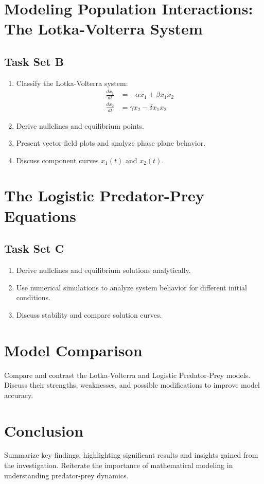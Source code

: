 \documentclass[12pt]{article}
\begin{document}
\section{Modeling Population Interactions: The Lotka-Volterra System}
\subsection{Task Set B}
\begin{enumerate}
    \item Classify the Lotka-Volterra system:
    \begin{align}
        \frac{dx_1}{dt} &= -\alpha x_1 + \beta x_1 x_2 \\
        \frac{dx_2}{dt} &= \gamma x_2 - \delta x_1 x_2
    \end{align}
    \item Derive nullclines and equilibrium points.
    \item Present vector field plots and analyze phase plane behavior.
    \item Discuss component curves $x_1(t)$ and $x_2(t)$.
\end{enumerate}

\section{The Logistic Predator-Prey Equations}
\subsection{Task Set C}
\begin{enumerate}
    \item Derive nullclines and equilibrium solutions analytically.
    \item Use numerical simulations to analyze system behavior for different initial conditions.
    \item Discuss stability and compare solution curves.
\end{enumerate}

\section{Model Comparison}
Compare and contrast the Lotka-Volterra and Logistic Predator-Prey models. Discuss their strengths, weaknesses, and possible modifications to improve model accuracy.

\section{Conclusion}
Summarize key findings, highlighting significant results and insights gained from the investigation. Reiterate the importance of mathematical modeling in understanding predator-prey dynamics.
\end{document}
